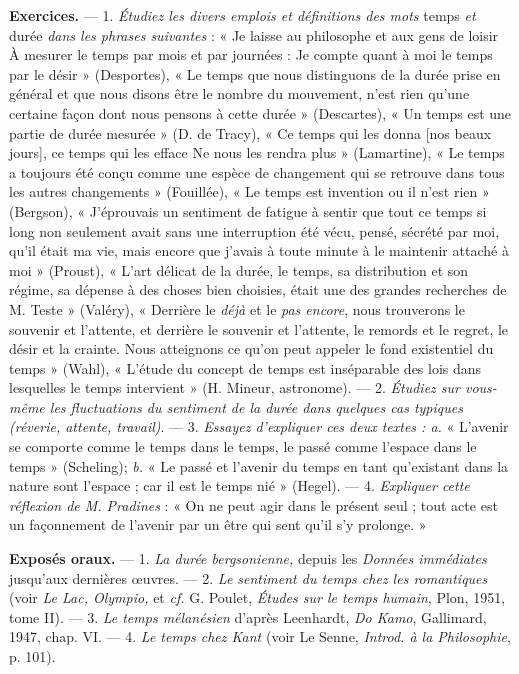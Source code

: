 {\bf Exercices.} — 1. {\it Étudiez les divers emplois et définitions des mots} temps {\it et}
durée {\it dans les phrases suivantes} : « Je laisse au philosophe et aux gens de loisir
À mesurer le temps par mois et par journées : Je compte quant à moi le
temps par le désir » (Desportes), « Le temps que nous distinguons de la
durée prise en général et que nous disons être le nombre du mouvement, n’est
rien qu’une certaine façon dont nous pensons à cette durée » (Descartes),
« Un temps est une partie de durée mesurée » (D. de Tracy), « Ce temps
qui les donna [nos beaux jours], ce temps qui les efface Ne nous les rendra
plus » (Lamartine), « Le temps a toujours été conçu comme une espèce
de changement qui se retrouve dans tous les autres changements »
(Fouillée), « Le temps est invention ou il n’est rien » (Bergson),
« J'éprouvais un sentiment de fatigue à sentir que tout ce temps si long
non seulement avait sans une interruption été vécu, pensé, sécrété par
moi, qu'il était ma vie, mais encore que j'avais à toute minute à le
maintenir attaché à moi » (Proust), « L'art délicat de la durée, le temps, sa
distribution et son régime, sa dépense à des choses bien choisies, était une
des grandes recherches de M. Teste » (Valéry), « Derrière le {\it déjà} et le {\it pas
encore}, nous trouverons le souvenir et l'attente, et derrière le souvenir et
l'attente, le remords et le regret, le désir et la crainte. Nous atteignons ce
qu’on peut appeler le fond existentiel du temps » (Wahl), « L'étude du
concept de temps est inséparable des lois dans lesquelles le temps intervient »
(H. Mineur, astronome). — 2. {\it Étudiez sur vous-même les fluctuations du
sentiment de la durée dans quelques cas typiques (réverie, attente, travail)}. —
3. {\it Essayez d'expliquer ces deux textes : a.} « L'avenir se comporte comme le
temps dans le temps, le passé comme l’espace dans le temps » (Scheling);
{\it b.} « Le passé et l’avenir du temps en tant qu’existant dans la nature sont
l'espace ; car il est le temps nié » (Hegel). — 4. {\it Expliquer cette réflexion de
M. Pradines} : « On ne peut agir dans le présent seul ; tout acte est un façonnement
de l’avenir par un être qui sent qu’il s’y prolonge. »

{\bf Exposés oraux.} — 1. {\it La durée bergsonienne,} depuis les {\it Données immédiates}
jusqu'aux dernières œuvres. — 2. {\it Le sentiment du temps chez les romantiques}
(voir {\it Le Lac, Olympio,} et {\it cf.} G. Poulet, {\it Études sur le temps humain}, Plon,
1951, tome II). — 3. {\it Le temps mélanésien} d'après Leenhardt, {\it Do Kamo},
Gallimard, 1947, chap. VI. — 4. {\it Le temps chez Kant} (voir Le Senne,
{\it Introd. à la Philosophie}, p. 101).

